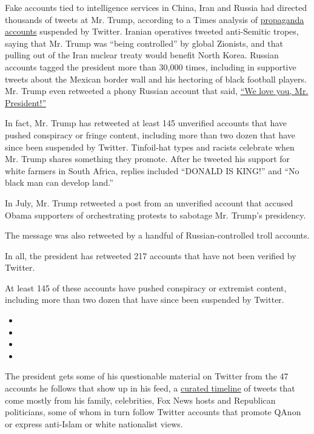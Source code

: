 Fake accounts tied to intelligence services in China, Iran and Russia
had directed thousands of tweets at Mr. Trump, according to a Times
analysis of
\href{https://about.twitter.com/en_us/values/elections-integrity.html\#data}{propaganda
accounts} suspended by Twitter. Iranian operatives tweeted anti-Semitic
tropes, saying that Mr. Trump was ``being controlled'' by global
Zionists, and that pulling out of the Iran nuclear treaty would benefit
North Korea. Russian accounts tagged the president more than 30,000
times, including in supportive tweets about the Mexican border wall and
his hectoring of black football players. Mr. Trump even retweeted a
phony Russian account that said,
\href{https://www.tennessean.com/story/news/politics/2017/10/18/twitter-suspends-fake-tennessee-gop-account-later-linked-russian-troll-farm/776937001/}{``We
love you, Mr. President!''}

In fact, Mr. Trump has retweeted at least 145 unverified accounts that
have pushed conspiracy or fringe content, including more than two dozen
that have since been suspended by Twitter. Tinfoil-hat types and racists
celebrate when Mr. Trump shares something they promote. After he tweeted
his support for white farmers in South Africa, replies included ``DONALD
IS KING!'' and ``No black man can develop land.''

In July, Mr. Trump retweeted a post from an unverified account that
accused Obama supporters of orchestrating protests to sabotage Mr.
Trump's presidency.

The message was also retweeted by a handful of Russian-controlled troll
accounts.

In all, the president has retweeted 217 accounts that have not been
verified by Twitter.

At least 145 of these accounts have pushed conspiracy or extremist
content, including more than two dozen that have since been suspended by
Twitter.

\begin{itemize}
\item
\item
\item
\item
\end{itemize}

The president gets some of his questionable material on Twitter from the
47 accounts he follows that show up in his feed, a
\href{https://help.twitter.com/en/using-twitter/twitter-timeline}{curated
timeline} of tweets that come mostly from his family, celebrities, Fox
News hosts and Republican politicians, some of whom in turn follow
Twitter accounts that promote QAnon or express anti-Islam or white
nationalist views.

